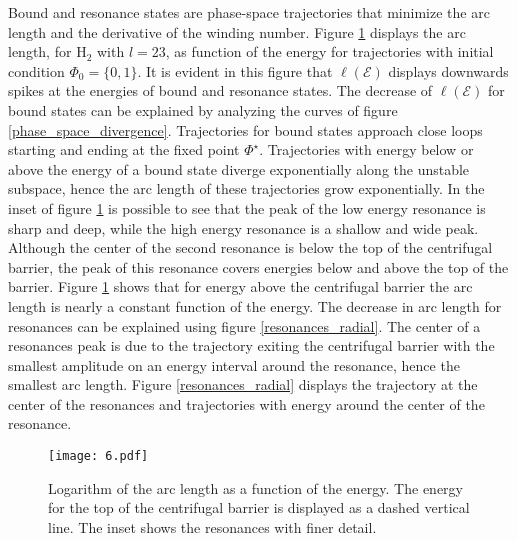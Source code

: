 \documentclass[%
 aip,
 numerical,
 jcp,
 floatfix,
rsi,%
amsmath,amssymb,
reprint,%
author-year%
]{revtex4-1}
\begin{document}
Bound and resonance states are phase-space trajectories that minimize the arc length and the derivative of the winding number. Figure \ref{arclenght_fig} displays the arc length, for $\mathrm{H}_2$ with $l=23$, as function of the energy for trajectories with initial condition $\Phi_0=\{0,1\}$. It is evident in this figure that $\ell(\mathcal{E})$ displays downwards spikes at the energies of bound and resonance states. The decrease of $\ell(\mathcal{E})$ for bound states can be explained by analyzing the curves of figure \ref{phase_space_divergence}. Trajectories for bound states approach close loops starting and ending at the fixed point $\Phi^\star$. Trajectories with energy below or above the energy of a bound state diverge exponentially along the unstable subspace, hence the arc length of these trajectories grow exponentially. In the inset of figure \ref{arclenght_fig} is possible to see that the peak of the low energy resonance is sharp and deep, while the high energy resonance is a shallow and wide peak. Although the center of the second resonance is below the top of the centrifugal barrier, the peak of this resonance covers energies below and above the top of the barrier. Figure \ref{arclenght_fig} shows that for energy above the centrifugal barrier the arc length is nearly a constant function of the energy. The decrease in arc length for resonances can be explained using figure \ref{resonances_radial}. The center of a resonances peak is due to the trajectory exiting the centrifugal barrier with the smallest amplitude on an energy interval around the resonance, hence the smallest arc length. Figure \ref{resonances_radial} displays the trajectory at the center of the resonances and trajectories with energy around the center of the resonance.

\begin{figure}
\texttt{[image: 6.pdf]}
\caption{Logarithm of the arc length as a function of the energy.  The energy for the top of the centrifugal barrier is displayed as a dashed vertical line. The inset shows the resonances with finer detail.}\label{arclenght_fig}
\end{figure}
\end{document}
